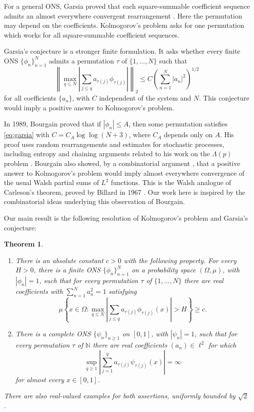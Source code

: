 \documentclass[11pt]{article}
\newtheorem{theorem}{Theorem}
\theoremstyle{remark}
\numberwithin{equation}{section}
\newcommand{\N}{\mathbb N}
\begin{document}
For a general ONS, Garsia proved that each square-summable coefficient sequence admits an almost everywhere convergent rearrangement \cite{Garsia1964,Garsia1970}. Here the permutation may depend on the coefficients. Kolmogorov's problem asks for one permutation which works for all square-summable coefficient sequences.

Garsia's conjecture \cite{Garsia1970} is a stronger finite formulation. It asks whether every finite ONS $\{\phi_n\}_{n=1}^N$ admits a permutation $\tau$ of $\{1,\ldots,N\}$ such that
\begin{equation}\label{eq:garsia}
 \left\|\max_{q\leq N}\left|\sum_{j\leq q}
 a_{\tau(j)}\phi_{\tau(j)}\right|\right\|_2
 \leq C\left(\sum_{n=1}^N|a_n|^2\right)^{1/2}
\end{equation}
for all coefficients $\{a_n\}$, with $C$ independent of the system and $N$. This conjecture would imply a positive answer to Kolmogorov's problem.

In 1989, Bourgain \cite{Bourgain} proved that if $|\phi_n|\leq A$, then some permutation satisfies \eqref{eq:garsia} with $C=C_A\log\log(N+3)$, where $C_A$ depends only on $A$. His proof uses random rearrangements and estimates for stochastic processes, including entropy and chaining arguments related to his work on the $\Lambda(p)$ problem \cite{BourgainLambda}. Bourgain also showed, by a combinatorial argument \cite[Section~2]{Bourgain}, that a positive answer to Kolmogorov's problem would imply almost everywhere convergence of the usual Walsh partial sums of $L^2$ functions. This is the Walsh analogue of Carleson's theorem, proved by Billard in 1967 \cite{Billard}. Our work here is inspired by the combinatorial ideas underlying this observation of Bourgain.

Our main result is the following resolution of Kolmogorov's problem and Garsia's conjecture:

\begin{theorem}\label{thm:main}
\leavevmode
\begin{enumerate}
\item There is an absolute constant $c>0$ with the following property. For every $H>0$, there is a finite ONS $\{\phi_n\}_{n=1}^N$ on a probability space $(\Omega,\mu)$, with $|\phi_n|=1$, such that for every permutation $\tau$ of $\{1,\ldots,N\}$ there are real coefficients with $\sum_{n=1}^N a_n^2=1$ satisfying
\[
 \mu\left\{x\in\Omega:\max_{q\leq N}
 \left|\sum_{j\leq q}a_{\tau(j)}\phi_{\tau(j)}(x)\right|>H\right\}\geq c.
\]
\item There is a complete ONS $\{\psi_n\}_{n\geq1}$ on $[0,1]$, with $|\psi_n|=1$, such that for every permutation $\tau$ of $\N$ there are real coefficients $(a_n)\in\ell^2$ for which
\[
 \sup_{q\geq1}\left|\sum_{j=1}^q a_{\tau(j)}\psi_{\tau(j)}(x)\right|=\infty
\]
for almost every $x\in[0,1]$.
\end{enumerate}
There are also real-valued examples for both assertions, uniformly bounded by $\sqrt2$.
\end{theorem}
\end{document}
